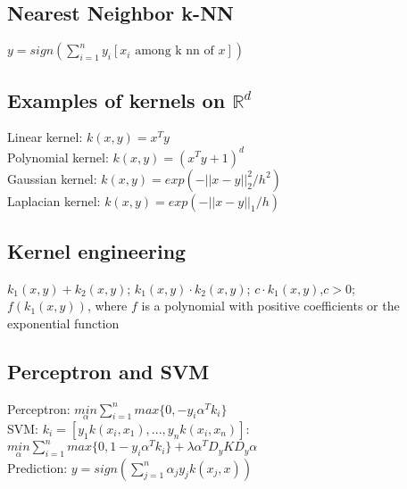 \subsection*{Nearest Neighbor k-NN}
$y=sign(\sum_{i=1}^n y_i [x_i \text{ among k nn of } x])$

\subsection*{Examples of kernels on $\mathbb{R}^d$}
Linear kernel: $k(x,y)=x^T y$\\
Polynomial kernel: $k(x,y)=(x^T y + 1)^d$\\
Gaussian kernel: $k(x,y) = exp(-||x-y||_2^2/h^2)$\\
Laplacian kernel: $k(x,y) = exp(-||x-y||_1/h)$


\subsection*{Kernel engineering}
$k_1(x,y) + k_2(x,y)$; $k_1(x,y) \cdot k_2(x,y)$; $c \cdot k_1(x,y)$,$c>0$;\\
$f(k_1(x,y))$, where $f$ is a polynomial with positive coefficients or the exponential function

\iffalse
\subsection*{Parametric vs. Nonparametric}
\emph{Parametric}: have finite set of parameters\\
E.g. linear regression, linear perceptron,...\\
\emph{Nonparametric}: grow in complexity with the size of the data\\
E.g. kernelized Perceptron, k-NN,...
\fi

\subsection*{Perceptron and SVM}
Perceptron: $\underset{\alpha}{min}\sum_{i=1}^n max\{0,-y_i \alpha^T k_i\}$\\
SVM: $k_i=[y_1 k(x_i,x_1), ..., y_n k(x_i,x_n)]$:\\
$\underset{\alpha}{min}\sum_{i=1}^n max\{0,1-y_i \alpha^T k_i\} +\lambda\alpha^T D_y K D_y \alpha$\\
Prediction: $y = sign(\sum_{j=1}^n \alpha_j y_j k(x_j,x))$

